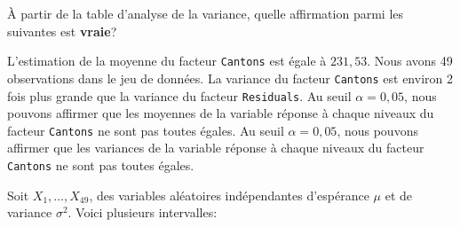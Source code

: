 \begin{questions}
À partir de la table d'analyse de la variance, quelle affirmation parmi les suivantes est \textbf{vraie}?



\begin{checkboxes}
\choice L'estimation de la moyenne du facteur \texttt{Cantons} est égale à $231,53$. 
\choice Nous avons 49 observations dans le jeu de données.
\choice La variance du facteur \texttt{Cantons} est environ 2 fois plus grande que la variance du facteur \texttt{Residuals}.
\correctchoice Au seuil $\alpha=0,05$, nous pouvons affirmer que les moyennes de la variable réponse à chaque niveaux du facteur \texttt{Cantons} ne sont pas toutes égales.
\choice Au seuil $\alpha=0,05$, nous pouvons affirmer que les variances de la variable réponse à chaque niveaux du facteur \texttt{Cantons} ne sont pas toutes égales.
\end{checkboxes}

\pageblanche

\question Soit $X_1,\hdots, X_{49}$, des variables aléatoires indépendantes d'espérance $\mu$ et de variance $\sigma^2$. Voici plusieurs intervalles:
\begin{center}
    

\end{center}
\end{questions}
